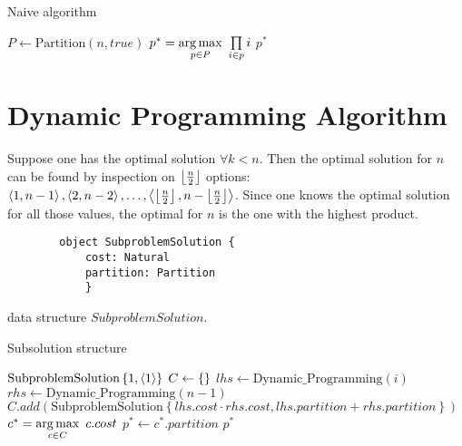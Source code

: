 \begin{algorithm}[H]
    \caption{Naive algorithm}
    \label{number-splitting:algorithm:naive-algorithm}
    \begin{algorithmic}[1]
            \State $P \gets \text{Partition}(n, true)$
            \State $p^* = \operatorname*{arg\,max}\limits_{p \in P} \ \prod\limits_{i \in p} i$
            \State \Return $p^*$
        \EndFunction
        \end{algorithmic}
\end{algorithm}

\section{Dynamic Programming Algorithm}

Suppose one has the optimal solution $\forall k < n$. Then the optimal solution for $n$ can be found by inspection on $\left\lfloor \frac{n}{2} \right\rfloor$ options: $\left\langle 1, n-1 \right\rangle, \left\langle 2, n-2 \right\rangle, \dots, \left\langle \left\lfloor \frac{n}{2} \right\rfloor, n-\left\lfloor \frac{n}{2} \right\rfloor \right\rangle$. Since one knows the optimal solution for all those values, the optimal for $n$ is the one with the highest product.

\begin{algorithm}
    \begin{lstlisting}
        object SubproblemSolution {
            cost: Natural
            partition: Partition
            }
        \end{lstlisting}
        \caption{data structure $SubproblemSolution$.}
    \end{algorithm}

\newcommand{\SubproblemSolution}[2]{\text{SubproblemSolution}\left\{ #1, #2 \right\}}
\newcommand{\DP}[1]{\text{Dynamic\_Programming}\left( #1 \right)}

\begin{algorithm}[H]
    \caption{Subsolution structure}
    \label{number-splitting:algorithm:dynamic-programming}
    \begin{algorithmic}[1]
                \State \Return $\SubproblemSolution{1}{\tuple{1}}$
            \Else
                \State $C \gets \left\{  \right\}$
                    \State $lhs \gets \DP{i}$
                    \State $rhs \gets \DP{n - 1}$
                    \State $C.add\left( \SubproblemSolution{lhs.cost \cdot rhs.cost}{lhs.partition + rhs.partition} \right)$
                \EndFor
                \State $c^* = \operatorname*{arg\,max}\limits_{c \in C} \ c.cost$
                \State $p^* \gets c^*.partition$
                \State \Return $p^*$
            \EndIf
        \EndFunction
        \end{algorithmic}
\end{algorithm}
